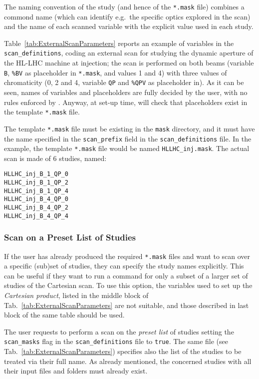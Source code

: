 The naming convention of the study (and hence of the \texttt{*.mask} file)
combines a commond name (which can identify e.g.~the specific optics explored in
the scan) and the name of each scanned variable
with the explicit value used in each study.

Table~\ref{tab:ExternalScanParameters} reports an example of
variables in the \texttt{scan\_definitions}, coding an external scan for
studying the dynamic aperture of the HL-LHC machine at injection; the
scan is performed on both beams (variable \texttt{B}, \texttt{\%BV}
as placeholder in \texttt{*.mask}, and values 1 and 4) with three values
of chromaticity (0, 2 and 4, variable \texttt{QP} and \texttt{\%QPV} as
placeholder in). As it can be seen, names of variables and placeholders
are fully decided by the user, with no rules enforced by \SIXDESK{}.
Anyway, at set-up time, \SIXDESK{} will check that placeholders exist in
the template \texttt{*.mask} file.

The template \texttt{*.mask} file must be existing in the \texttt{mask}
directory, and it must have the name specified in the \texttt{scan\_prefix}
field in the \texttt{scan\_definitions} file. In the example,
the template \texttt{*.mask} file would be named \texttt{HLLHC\_inj.mask}.
The actual scan is made of 6 studies, named:
\begin{lstlisting}
HLLHC_inj_B_1_QP_0
HLLHC_inj_B_1_QP_2
HLLHC_inj_B_1_QP_4
HLLHC_inj_B_4_QP_0
HLLHC_inj_B_4_QP_2
HLLHC_inj_B_4_QP_4
\end{lstlisting}

\subsubsection{Scan on a Preset List of Studies}
If the user has already produced the required \texttt{*.mask} files
and want to scan over a specific (sub)set of studies, they can
specify the study names explicitly. This can be useful if they want
to run a command for only a subset of a larger set of studies of the
Cartesian scan. To use this option, the variables used to set up
the \emph{Cartesian product}, listed in the middle block of
Tab.~\ref{tab:ExternalScanParameters} are not suitable, and
those described in last block of the same table should be used.

The user requests \SIXDESK{} to perform a scan on the \emph{preset list}
of studies setting the \texttt{scan\_masks} flag in the
\texttt{scan\_definitions} file to \texttt{true}. The same file
(see Tab.~\ref{tab:ExternalScanParameters}) specifies also the list
of the studies to be treated via their full name.
As already mentioned, the concerned studies with all their input files
and folders must already exist.

